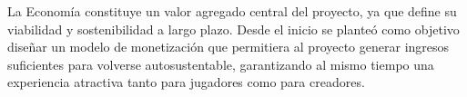La Economía constituye un valor agregado central del proyecto, 
ya que define su viabilidad y sostenibilidad a largo plazo. 
Desde el inicio se planteó como objetivo diseñar un modelo de monetización que permitiera 
al proyecto generar ingresos suficientes para volverse autosustentable, garantizando al 
mismo tiempo una experiencia atractiva tanto para jugadores como para creadores.
